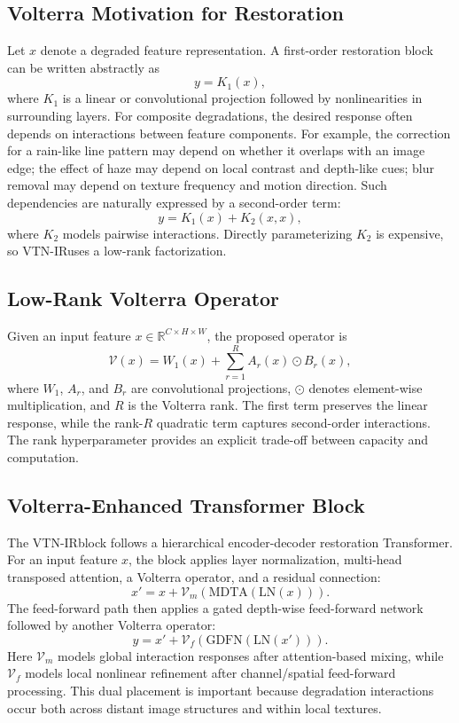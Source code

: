 \documentclass[10pt,twocolumn]{article}
\newcommand{\ours}{VTN-IR}
\begin{document}
\subsection{Volterra Motivation for Restoration}
Let $x$ denote a degraded feature representation. A first-order restoration block can be written abstractly as
\begin{equation}
    y = K_1(x),
\end{equation}
where $K_1$ is a linear or convolutional projection followed by nonlinearities in surrounding layers. For composite degradations, the desired response often depends on interactions between feature components. For example, the correction for a rain-like line pattern may depend on whether it overlaps with an image edge; the effect of haze may depend on local contrast and depth-like cues; blur removal may depend on texture frequency and motion direction. Such dependencies are naturally expressed by a second-order term:
\begin{equation}
    y = K_1(x) + K_2(x, x),
\end{equation}
where $K_2$ models pairwise interactions. Directly parameterizing $K_2$ is expensive, so \ours uses a low-rank factorization.

\subsection{Low-Rank Volterra Operator}
Given an input feature $x \in \mathbb{R}^{C \times H \times W}$, the proposed operator is
\begin{equation}
    \mathcal{V}(x) = W_1(x) + \sum_{r=1}^{R} A_r(x) \odot B_r(x),
\end{equation}
where $W_1$, $A_r$, and $B_r$ are convolutional projections, $\odot$ denotes element-wise multiplication, and $R$ is the Volterra rank. The first term preserves the linear response, while the rank-$R$ quadratic term captures second-order interactions. The rank hyperparameter provides an explicit trade-off between capacity and computation.

\subsection{Volterra-Enhanced Transformer Block}
The \ours block follows a hierarchical encoder-decoder restoration Transformer. For an input feature $x$, the block applies layer normalization, multi-head transposed attention, a Volterra operator, and a residual connection:
\begin{equation}
    x' = x + \mathcal{V}_{m}(\mathrm{MDTA}(\mathrm{LN}(x))).
\end{equation}
The feed-forward path then applies a gated depth-wise feed-forward network followed by another Volterra operator:
\begin{equation}
    y = x' + \mathcal{V}_{f}(\mathrm{GDFN}(\mathrm{LN}(x'))).
\end{equation}
Here $\mathcal{V}_{m}$ models global interaction responses after attention-based mixing, while $\mathcal{V}_{f}$ models local nonlinear refinement after channel/spatial feed-forward processing. This dual placement is important because degradation interactions occur both across distant image structures and within local textures.
\end{document}
